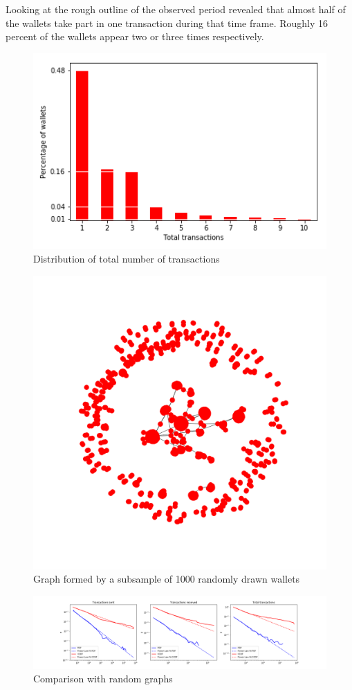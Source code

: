 Looking at the rough outline of the observed period revealed that almost half of the wallets take part in one transaction during that time frame. Roughly 16 percent of the wallets appear two or three times respectively.

\begin{figure}[h]
\centering
\includegraphics[scale=0.5]{../pics/distribution.png}
\caption{Distribution of total number of transactions}
\end{figure}

\begin{figure}
\centering
\includegraphics[scale=0.45]{../analysis/graph-subsample-1000.png}
\caption{Graph formed by a subsample of 1000 randomly drawn wallets}
\end{figure}


\begin{figure}
\centering
\includegraphics[width=\textwidth]{../analysis/power-law-fit.png}
\caption{Comparison with random graphs}
\end{figure}
